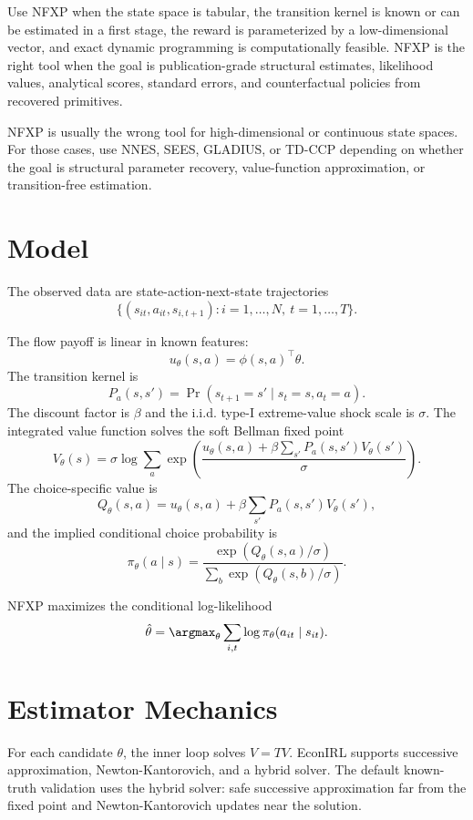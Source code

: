 \documentclass[10pt]{article}
\begin{document}
Use NFXP when the state space is tabular, the transition kernel is known or can
be estimated in a first stage, the reward is parameterized by a low-dimensional
vector, and exact dynamic programming is computationally feasible. NFXP is the
right tool when the goal is publication-grade structural estimates, likelihood
values, analytical scores, standard errors, and counterfactual policies from
recovered primitives.

NFXP is usually the wrong tool for high-dimensional or continuous state spaces.
For those cases, use NNES, SEES, GLADIUS, or TD-CCP depending on whether the
goal is structural parameter recovery, value-function approximation, or
transition-free estimation.

\section{Model}

The observed data are state-action-next-state trajectories
\[
\{(s_{it}, a_{it}, s_{i,t+1}) : i=1,\ldots,N,\ t=1,\ldots,T\}.
\]

The flow payoff is linear in known features:
\[
u_\theta(s,a) = \phi(s,a)^\top \theta.
\]
The transition kernel is
\[
P_a(s,s') = \Pr(s_{t+1}=s' \mid s_t=s, a_t=a).
\]
The discount factor is $\beta$ and the i.i.d. type-I extreme-value shock scale
is $\sigma$. The integrated value function solves the soft Bellman fixed point
\[
V_\theta(s)
= \sigma \log \sum_a
\exp\left(
\frac{
u_\theta(s,a)
+ \beta \sum_{s'} P_a(s,s') V_\theta(s')
}{\sigma}
\right).
\]
The choice-specific value is
\[
Q_\theta(s,a)
= u_\theta(s,a) + \beta \sum_{s'} P_a(s,s')V_\theta(s'),
\]
and the implied conditional choice probability is
\[
\pi_\theta(a \mid s)
=
\frac{\exp(Q_\theta(s,a)/\sigma)}
{\sum_b \exp(Q_\theta(s,b)/\sigma)}.
\]

NFXP maximizes the conditional log-likelihood
\[
\hat{\theta}
=
\argmax_\theta
\sum_{i,t} \log \pi_\theta(a_{it} \mid s_{it}).
\]

\section{Estimator Mechanics}

For each candidate $\theta$, the inner loop solves $V=TV$. EconIRL supports
successive approximation, Newton-Kantorovich, and a hybrid solver. The default
known-truth validation uses the hybrid solver: safe successive approximation
far from the fixed point and Newton-Kantorovich updates near the solution.
\end{document}
